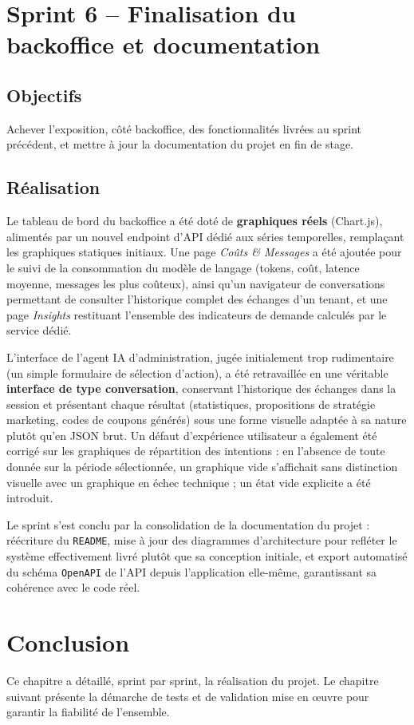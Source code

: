 \section{Sprint 6 -- Finalisation du backoffice et documentation}

\subsection*{Objectifs}
Achever l'exposition, côté backoffice, des fonctionnalités livrées au sprint précédent, et mettre à jour la documentation du projet en fin de stage.

\subsection*{Réalisation}

Le tableau de bord du backoffice a été doté de \textbf{graphiques réels} (Chart.js), alimentés par un nouvel endpoint d'API dédié aux séries temporelles, remplaçant les graphiques statiques initiaux. Une page \emph{Coûts \& Messages} a été ajoutée pour le suivi de la consommation du modèle de langage (tokens, coût, latence moyenne, messages les plus coûteux), ainsi qu'un navigateur de conversations permettant de consulter l'historique complet des échanges d'un tenant, et une page \emph{Insights} restituant l'ensemble des indicateurs de demande calculés par le service dédié.

L'interface de l'agent IA d'administration, jugée initialement trop rudimentaire (un simple formulaire de sélection d'action), a été retravaillée en une véritable \textbf{interface de type conversation}, conservant l'historique des échanges dans la session et présentant chaque résultat (statistiques, propositions de stratégie marketing, codes de coupons générés) sous une forme visuelle adaptée à sa nature plutôt qu'en JSON brut. Un défaut d'expérience utilisateur a également été corrigé sur les graphiques de répartition des intentions : en l'absence de toute donnée sur la période sélectionnée, un graphique vide s'affichait sans distinction visuelle avec un graphique en échec technique ; un état vide explicite a été introduit.

Le sprint s'est conclu par la consolidation de la documentation du projet : réécriture du \texttt{README}, mise à jour des diagrammes d'architecture pour refléter le système effectivement livré plutôt que sa conception initiale, et export automatisé du schéma \texttt{OpenAPI} de l'API depuis l'application elle-même, garantissant sa cohérence avec le code réel.

\section*{Conclusion}

Ce chapitre a détaillé, sprint par sprint, la réalisation du projet. Le chapitre suivant présente la démarche de tests et de validation mise en \oe{}uvre pour garantir la fiabilité de l'ensemble.
